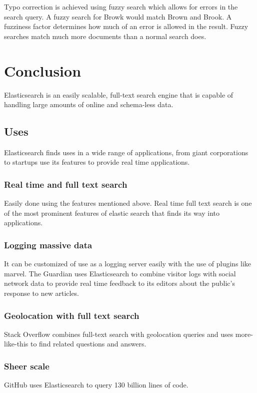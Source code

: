 \documentclass[12pt]{article}
\begin{document}
				Typo correction is achieved using fuzzy search which allows for errors in the search query. A fuzzy search for Browk would match Brown and Brook. A fuzziness factor determines how much of an error is allowed in the result. Fuzzy searches match much more documents than a normal search does. 

	\section{Conclusion}
		Elasticsearch is an easily scalable, full-text search engine that  is  capable  of  handling  large  amounts  of  online  and schema-less  data.

		\subsection{Uses}
			Elasticsearch finds uses in a wide range of applications, from giant corporations to startups use its features to provide real time applications.

			\subsubsection{Real time and full text search}
				Easily done using the features mentioned above. Real time full text search is one of the most prominent features of elastic search that finds its way into applications.

			\subsubsection{Logging massive data}
				It can be customized of use as a logging server easily with the use of plugins like marvel. The Guardian uses Elasticsearch to combine visitor logs with social network data to provide real time feedback to its editors about the public’s response to new articles.

			\subsubsection{Geolocation with full text search}
				Stack Overflow combines full-text search with geolocation queries and uses more-like-this to find related questions and answers.

			\subsubsection{Sheer scale}
				GitHub uses Elasticsearch to query 130 billion lines of code.
\end{document}
